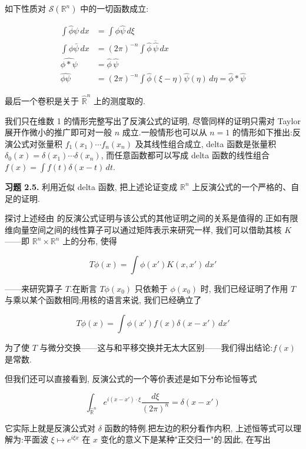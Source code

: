 \begin{corollary}\label{cor:c5-2.4}
如下性质对 $\mathcal{S}(\mathbb{R}^n)$ 中的一切函数成立:

\[
\begin{aligned}
\int\hat{\phi}\psi\, dx &= \int\phi\hat{\psi}\, d\xi \\
\int\phi\bar{\psi}\, dx &= (2\pi)^{-n}\int\hat{\phi}\, \overline{\hat{\psi}}\, dx \\
\widehat{\phi*\psi} &= \hat{\phi}\, \hat{\psi} \\
\widehat{\phi\psi} &= (2\pi)^{-n}\int\hat{\phi}(\xi-\eta)\hat{\psi}(\eta)\, d\eta = \hat{\phi}*\hat{\psi}
\end{aligned}
\]

最后一个卷积是关于 $\widehat{\mathbb{R}}^n$ 上的测度取的.
\end{corollary}

我们只在维数 1 的情形完整写出了反演公式的证明, 尽管同样的证明只需对 Taylor 展开作微小的推广即可对一般 $n$ 成立.一般情形也可以从 $n = 1$ 的情形如下推出:反演公式对张量积 $f_1(x_1)\cdots f_n(x_n)$ 及其线性组合成立, delta 函数是张量积 $\delta_0(x) = \delta(x_1)\cdots\delta(x_n)$, 而任意函数都可以写成 delta 函数的线性组合 $f(x) = \int f(t)\delta(x-t)\, dt$.

\textbf{习题 2.5.} 利用近似 delta 函数, 把上述论证变成 $\mathbb{R}^n$ 上反演公式的一个严格的、自足的证明.

探讨上述经由 的反演公式证明与该公式的其他证明之间的关系是值得的.正如有限维向量空间之间的线性算子可以通过矩阵表示来研究一样, 我们可以借助其核 $K$——即 $\mathbb{R}^n\times\mathbb{R}^n$ 上的分布, 使得

\[
T\phi(x) = \int\phi(x')K(x, x')\, dx'
\]

——来研究算子 $T$.在断言 $T\phi(x_0)$ 只依赖于 $\phi(x_0)$ 时, 我们已经证明了作用 $T$ 与乘以某个函数相同;用核的语言来说, 我们已经确立了

\[
T\phi(x) = \int\phi(x')f(x)\delta(x-x')\, dx'
\]

为了使 $T$ 与微分交换——这与和平移交换并无太大区别——我们得出结论:$f(x)$ 是常数.

但我们还可以直接看到, 反演公式的一个等价表述是如下分布论恒等式

\begin{equation}
\int_{\widehat{\mathbb{R}}^n} e^{i(x-x')\cdot\xi}\frac{d\xi}{(2\pi)^n} = \delta(x-x')\label{eq:c5-162}
\end{equation}

它实际上就是反演公式对 $\delta$ 函数的特例.把左边的积分看作内积, 上述恒等式可以理解为:平面波 $\xi\mapsto e^{i\xi x}$ 在 $x$ 变化的意义下是某种"正交归一"的.因此, 在写出


